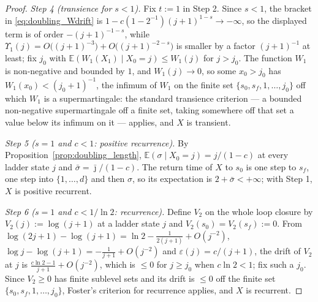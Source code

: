 \begin{proof}
\emph{Step 4 (transience for $s<1$).} Fix $t:=1$ in Step 2. Since $s<1$, the bracket in
\eqref{eq:doubling_Wdrift} is $1-c\left(1-2^{-1}\right)(j+1)^{1-s}\rightarrow-\infty$, so the
displayed term is of order $-(j+1)^{-1-s}$, while
$\Upsilon_1(j)=O\bigl((j+1)^{-3}\bigr)+O\bigl((j+1)^{-2-s}\bigr)$ is smaller by a factor $(j+1)^{-1}$
at least; fix $j_0$ with $\mathbb E(W_1(X_1)\mid X_0=j)\leq W_1(j)$ for $j>j_0$. The function $W_1$ is
non-negative and bounded by $1$, and $W_1(j)\rightarrow0$, so some $x_0>j_0$ has
$W_1(x_0)<(j_0+1)^{-1}$, the infimum of $W_1$ on the finite set $\{s_0,s_f,1,\dots,j_0\}$ off
which $W_1$ is a supermartingale: the standard transience criterion --- a bounded
non-negative supermartingale off a finite set, taking somewhere off that set a value below
its infimum on it --- applies, and $X$ is transient.

\emph{Step 5 ($s=1$ and $c<1$: positive recurrence).} By
Proposition~\ref{prop:doubling_length}, $\mathbb E(\sigma\mid X_0=j)=j/(1-c)$ at every ladder state
$j$ and $\bar\sigma=\bar\jmath/(1-c)$. The return time of $X$ to $s_0$ is one step to $s_f$,
one step into $\{1,\dots,d\}$ and then $\sigma$, so its expectation is
$2+\bar\sigma<+\infty$; with Step 1, $X$ is positive recurrent.

\emph{Step 6 ($s=1$ and $c<1/\ln2$: recurrence).} Define $V_2$ on the whole loop closure by
$V_2(j):=\log(j+1)$ at a ladder state $j$ and $V_2(s_0)=V_2(s_f):=0$. From
$\log(2j+1)-\log(j+1)=\ln2-\tfrac1{2(j+1)}+O(j^{-2})$,
$\log j-\log(j+1)=-\tfrac1{j+1}+O(j^{-2})$ and $\varepsilon(j)=c/(j+1)$, the drift of $V_2$ at
$j$ is $\frac{c\ln2-1}{j+1}+O(j^{-2})$, which is $\leq0$ for $j\geq j_0$ when $c\ln2<1$; fix
such a $j_0$. Since $V_2\geq0$ has finite sublevel sets and its drift is $\leq0$ off the finite
set $\{s_0,s_f,1,\dots,j_0\}$, Foster's criterion for recurrence applies, and $X$ is
recurrent.


\end{proof}
